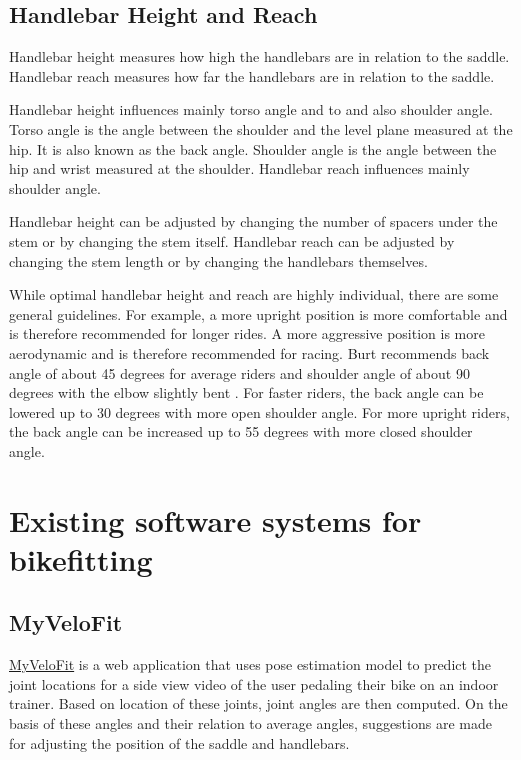 \subsection{Handlebar Height and Reach}
Handlebar height measures how high the handlebars are in relation to the saddle. Handlebar reach measures how far the handlebars are in relation to the saddle.

Handlebar height influences mainly torso angle and to and also shoulder angle. Torso angle is the angle between the shoulder and the level plane measured at the hip. It is also known as the back angle. Shoulder angle is the angle between the hip and wrist measured at the shoulder. Handlebar reach influences mainly shoulder angle.

Handlebar height can be adjusted by changing the number of spacers under the stem or by changing the stem itself. Handlebar reach can be adjusted by changing the stem length or by changing the handlebars themselves.

While optimal handlebar height and reach are highly individual, there are some general guidelines. For example, a more upright position is more comfortable and is therefore recommended for longer rides. A more aggressive position is more aerodynamic and is therefore recommended for racing. Burt recommends back angle of about 45 degrees for average riders and shoulder angle of about 90 degrees with the elbow slightly bent \cite{burtbikefit}. For faster riders, the back angle can be lowered up to 30 degrees with more open shoulder angle. For more upright riders, the back angle can be increased up to 55 degrees with more closed shoulder angle.



\section{Existing software systems for bikefitting}

\subsection{MyVeloFit}
\href{https://www.myvelofit.com/}{MyVeloFit}  is a web application that uses pose estimation model to predict the joint locations for a side view video of the user pedaling their bike on an indoor trainer. Based on location of these joints, joint angles are then computed. On the basis of these angles and their relation to average angles, suggestions are made for adjusting the position of the saddle and handlebars.

